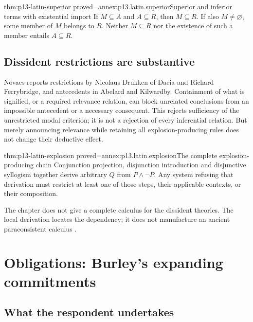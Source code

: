 \begin{hblemma}{thm:p13-latin-superior}
 {proved=annex:p13.latin.superior}{Superior and inferior terms with existential import}
If \(M\subseteq A\) and \(A\subseteq R\), then \(M\subseteq R\).
If also \(M\ne\varnothing\), some member of \(M\) belongs to \(R\).
Neither \(M\subseteq R\) nor the existence of such a member entails
\(A\subseteq R\).
\end{hblemma}

\subsection{Dissident restrictions are substantive}

Novaes reports restrictions by Nicolaus Drukken of Dacia and Richard
Ferrybridge, and antecedents in Abelard and Kilwardby.
Containment of what is signified, or a required relevance relation,
can block unrelated conclusions from an impossible antecedent or a
necessary consequent. This rejects sufficiency of the unrestricted
modal criterion; it is not a rejection of every inferential relation.
But merely announcing relevance while retaining all explosion-producing
rules does not change their deductive effect.

\begin{hblemma}{thm:p13-latin-explosion}
 {proved=annex:p13.latin.explosion}{The complete explosion-producing chain}
Conjunction projection, disjunction introduction and disjunctive syllogism
together derive arbitrary \(Q\) from \(P\land\neg P\).
Any system refusing that derivation must restrict at least one of those
steps, their applicable contexts, or their composition.
\end{hblemma}

The chapter does not give a complete calculus for the dissident theories.
The local derivation locates the dependency; it does not manufacture
an ancient paraconsistent calculus
\cite[pp.~479--484]{DutilhNovaes2007FordhamChapter8}.

\section{Obligations: Burley's expanding commitments}
\label{sec:p13-latin-burley-obligations}

\subsection{What the respondent undertakes}

